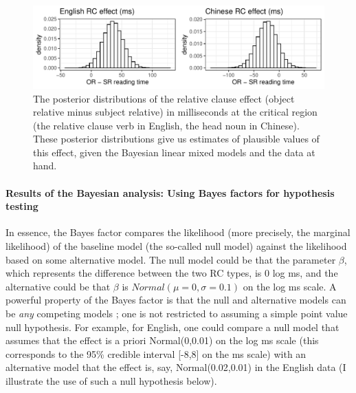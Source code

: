 \documentclass{ar-1col}\usepackage[]{graphicx}\usepackage[]{color}
\makeatletter
\def\maxwidth{ %
  \ifdim\Gin@nat@width>\linewidth
    \linewidth
  \else
    \Gin@nat@width
  \fi
}
\newenvironment{knitrout}{}{} %
\makeatother
\begin{document}
\begin{figure}
\centering
\begin{knitrout}
\color{fgcolor}

{\centering \includegraphics[width=\maxwidth]{figures/fig-unnamed-chunk-17-1} 

}


\end{knitrout}
\caption{The posterior distributions of the relative clause effect (object relative minus subject relative) in milliseconds at the critical region (the relative clause verb in English, the head noun in Chinese). These posterior distributions give us estimates of plausible values of this effect, given the Bayesian linear mixed models and the data at hand.}\label{fig:posteriors}
\end{figure}

\paragraph{Results of the Bayesian analysis: Using Bayes factors for hypothesis testing}

In essence, the Bayes factor compares the likelihood (more precisely, the marginal likelihood) of the baseline model (the so-called null model) against the likelihood based on some alternative model.
The null model could be that the parameter $\beta$, which represents the difference between the two RC types, is 0 log ms, and the alternative could be that $\beta$ is $Normal(\mu=0,\sigma=0.1)$  on the log ms scale. A powerful property of the Bayes factor is that the null and alternative models can be \textit{any} competing models \citep[e.g.,][]{rouder2021there}; one is not restricted to assuming a simple point value null hypothesis. For example, for English, one could compare a null model that assumes that the effect is a priori Normal(0,0.01) on the log ms scale (this corresponds to the 95\% credible interval  [-8,8] on the ms scale) with an alternative model that the effect is, say, Normal(0.02,0.01) in the English data (I illustrate the use of such a null hypothesis below).
\end{document}
